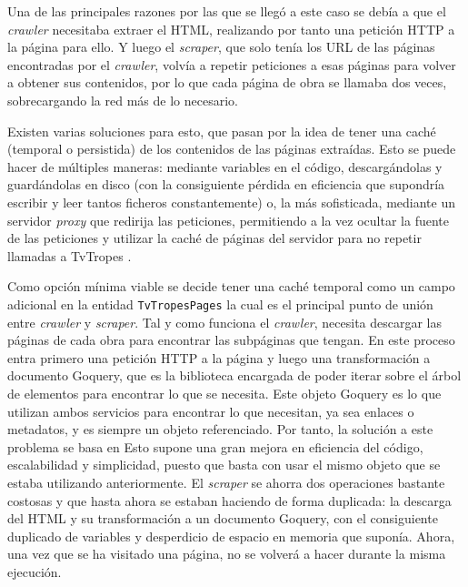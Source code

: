 Una de las principales razones por las que se llegó a este caso se debía a que
el \textit{crawler} necesitaba extraer el HTML, realizando por tanto una
petición HTTP a la página para ello. Y luego el \textit{scraper}, que solo tenía
los URL de las páginas encontradas por el \textit{crawler}, volvía a repetir
peticiones a esas páginas para volver a obtener sus contenidos, por lo que cada
página de obra se llamaba dos veces, sobrecargando la red más de lo necesario.

Existen varias soluciones para esto, que pasan por la idea de tener una caché
(temporal o persistida) de los contenidos de las páginas extraídas. Esto se
puede hacer de múltiples maneras: mediante variables en el código,
descargándolas y guardándolas en disco (con la consiguiente pérdida en
eficiencia que supondría escribir y leer tantos ficheros constantemente) o, la
más sofisticada, mediante un servidor \textit{proxy} que redirija las
peticiones, permitiendo a la vez ocultar la fuente de las peticiones y utilizar
la caché de páginas del servidor para no repetir llamadas a TvTropes
\cite{apress2018scraping}.

Como opción mínima viable se decide tener una caché temporal como un campo
adicional en la entidad \texttt{TvTropesPages} la cual es el principal punto de
unión entre \textit{crawler} y \textit{scraper}. Tal y como funciona el
\textit{crawler}, necesita descargar las páginas de cada obra para encontrar las
subpáginas que tengan. En este proceso entra primero una petición HTTP a la
página y luego una transformación a documento Goquery, que es la biblioteca
encargada de poder iterar sobre el árbol de elementos para encontrar lo que se
necesita. Este objeto Goquery es lo que utilizan ambos servicios para encontrar
lo que necesitan, ya sea enlaces o metadatos, y es siempre un objeto
referenciado. Por tanto, la solución a este problema se basa en  Esto supone una
gran mejora en eficiencia del código, escalabilidad y simplicidad, puesto que
basta con usar el mismo objeto que se estaba utilizando anteriormente. El
\textit{scraper} se ahorra dos operaciones bastante costosas y que hasta ahora
se estaban haciendo de forma duplicada: la descarga del HTML y su transformación
a un documento Goquery, con el consiguiente duplicado de variables y desperdicio
de espacio en memoria que suponía. Ahora, una vez que se ha visitado una página,
no se volverá a hacer durante la misma ejecución.


